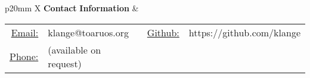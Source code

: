 \documentclass[11pt,a4paper]{article}
\begin{document}
\begin{CJK}{UTF8}{goth}


\hfill\break

\begin{tabularx}{\textwidth}{ p{20mm} X }
	\textbf{Contact} \newline \textbf{Information} &
	\begin{tabular}[t]{@{}rlrl@{}}
		\underline{Email:}  & klange@toaruos.org        &  \underline{Github:} & https://github.com/klange \\
		\underline{Phone:}  & (available on request)    & & \\
	\end{tabular}
\end{tabularx}

\hfill\break


\end{CJK}
\end{document}
